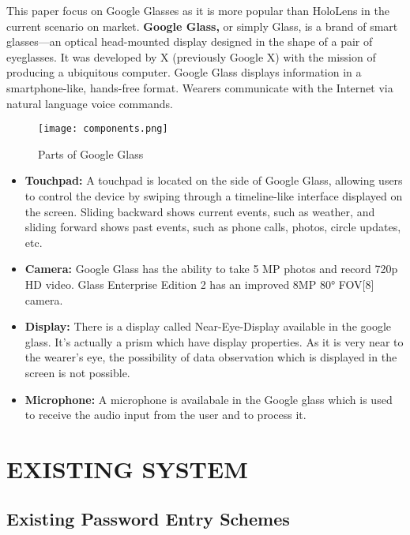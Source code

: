\documentclass[12pt,a4paper,oneside]{report}
\begin{document}
\newpage
This paper focus on Google Glasses as it is more popular than HoloLens in the current scenario on market.\newline
\textbf{ Google Glass,} or simply Glass, is a brand of smart glasses—an optical head-mounted display designed in the shape of a pair of eyeglasses. It was developed by X (previously Google X) with the mission of producing a ubiquitous computer. Google Glass displays information in a smartphone-like, hands-free format. Wearers communicate with the Internet via natural language voice commands. \begin{figure}[H]
    \begin{center}
        \label{abc}
            \texttt{[image: components.png]}
            \caption{Parts of Google Glass}
    \end{center}
\end{figure}
\begin{itemize}
\item \textbf{Touchpad:} A touchpad is located on the side of Google Glass, allowing users to control the device by swiping through a timeline-like interface displayed on the screen. Sliding backward shows current events, such as weather, and sliding forward shows past events, such as phone calls, photos, circle updates, etc.
\item \textbf{Camera:} Google Glass has the ability to take 5 MP photos and record 720p HD video. Glass Enterprise Edition 2 has an improved 8MP 80° FOV[8] camera.
\item \textbf{Display:} There is a display called Near-Eye-Display available in the google glass. It's actually a prism which have display properties. As it is very near to the wearer's eye, the possibility of data observation which is displayed in the screen is not possible.
\item \textbf{Microphone:} A microphone is availabale in the Google glass which is used to receive the audio input from the user and to process it.
\end{itemize}
\chapter{EXISTING SYSTEM}

\section{Existing Password Entry Schemes}
\end{document}
